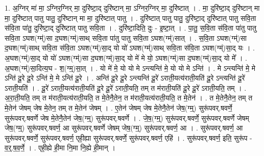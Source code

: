 \documentclass[17pt]{extarticle}
\begin{document}
1. अ॒ग्निर् मा॑ मा॒ ऽग्निर॒ग्निर् मा॒ दुरि॑ष्टा॒द् दुरि॑ष्टान् मा॒ ऽग्निर॒ग्निर् मा॒ दुरि॑ष्टात् । . मा॒ दुरि॑ष्टा॒द् दुरि॑ष्टान् मा मा॒ दुरि॑ष्टात् पातु पातु॒ दुरि॑ष्टान् मा मा॒ दुरि॑ष्टात् पातु । . दुरि॑ष्टात् पातु पातु॒ दुरि॑ष्टा॒द् दुरि॑ष्टात् पातु सवि॒ता स॑वि॒ता पा॑तु॒ दुरि॑ष्टा॒द् दुरि॑ष्टात् पातु सवि॒ता । . दुरि॑ष्टा॒दिति॒ दुः - इ॒ष्टा॒त् । . पा॒तु॒ स॒वि॒ता स॑वि॒ता पा॑तु पातु सवि॒ता ऽघश(ग्म्॑)सा द॒घश(ग्म्॑)साथ् सवि॒ता पा॑तु पातु सवि॒ता ऽघश(ग्म्॑)सात् । . स॒वि॒ता ऽघश(ग्म्॑)सा द॒घश(ग्म्॑)साथ् सवि॒ता स॑वि॒ता ऽघश(ग्म्॑)सा॒द् यो यो॑ ऽघश(ग्म्॑)साथ् सवि॒ता स॑वि॒ता ऽघश(ग्म्॑)सा॒द् यः । . अ॒घश(ग्म्॑)सा॒द् यो यो॑ ऽघश(ग्म्॑)सा द॒घश(ग्म्॑)सा॒द् यो मे॑ मे यो॒ ऽघश(ग्म्॑)सा द॒घश(ग्म्॑)सा॒द् यो मे᳚ । . अ॒घश(ग्म्॑)सा॒दित्य॒घ - श॒(ग्म्॒)सा॒त् । . यो मे॑ मे॒ यो यो मे ऽन्त्यन्ति॑ मे॒ यो यो मे ऽन्ति॑ । . मे ऽन्त्यन्ति॑ मे॒ मे ऽन्ति॑ दू॒रे दू॒रे ऽन्ति॑ मे॒ मे ऽन्ति॑ दू॒रे । . अन्ति॑ दू॒रे दू॒रे ऽन्त्यन्ति॑ दू॒रे॑ ऽराती॒यत्य॑राती॒यति॑ दू॒रे ऽन्त्यन्ति॑ दू॒रे॑ ऽराती॒यति॑ । . दू॒रे॑ ऽराती॒यत्य॑राती॒यति॑ दू॒रे दू॒रे॑ ऽराती॒यति॒ तम् त म॑राती॒यति॑ दू॒रे दू॒रे॑ ऽराती॒यति॒ तम् । . अ॒रा॒ती॒यति॒ तम् त म॑राती॒यत्य॑राती॒यति॒ त मे॒तेनै॒तेन॒ त म॑राती॒यत्य॑राती॒यति॒ त मे॒तेन॑ । . त मे॒तेनै॒तेन॒ तम् त मे॒तेन॑ जेषम् जेष मे॒तेन॒ तम् त मे॒तेन॑ जेषम् । . ए॒तेन॑ जेषम् जेष मे॒तेनै॒तेन॑ जेष॒(ग्म्॒) सुरू॑पवर्.षवर्णे॒ सुरू॑पवर्.षवर्णे जेष मे॒तेनै॒तेन॑ जेष॒(ग्म्॒) सुरू॑पवर्.षवर्णे । . जे॒ष॒(ग्म्॒) सुरू॑पवर्.षवर्णे॒ सुरू॑पवर्.षवर्णे जेषम् जेष॒(ग्म्॒) सुरू॑पवर्.षवर्ण॒ आ सुरू॑पवर्.षवर्णे जेषम् जेष॒(ग्म्॒) सुरू॑पवर्.षवर्ण॒ आ । . सुरू॑पवर्.षवर्ण॒ आ सुरू॑पवर्.षवर्णे॒ सुरू॑पवर्.षवर्ण॒ एही॒ह्या सुरू॑पवर्.षवर्णे॒ सुरू॑पवर्.षवर्ण॒ एहि॑ । . सुरू॑पवर्.षवर्ण॒ इति॒ सुरू॑प - व॒र्॒.ष॒व॒र्णे॒ । . एही॒ह्ये ही॒मा नि॒मा नि॒ह्ये ही॒मान् । \newline
\end{document}
